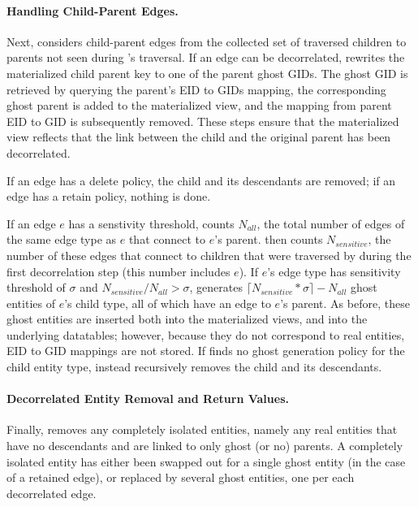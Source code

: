 \paragraph{Handling Child-Parent Edges.}
Next, \name considers child-parent edges from the collected set of traversed children to parents
not seen during \name's traversal. If an 
edge can be decorrelated, \name rewrites the materialized child parent key to one of the parent
ghost GIDs. The ghost GID is retrieved by querying the parent's EID to GIDs mapping, the
corresponding ghost parent is added to the materialized view,
and the mapping from parent EID to GID is subsequently removed. These steps ensure that the
materialized view reflects that the link between the child and the original parent has been
decorrelated.

If an edge has a delete policy, the child and its descendants are removed; if an edge has a retain
policy, nothing is done. 
%

If an edge $e$ has a senstivity threshold,
\name counts $N_{all}$, the total number of edges of the same edge type as $e$ that connect to $e$'s parent.
\name then counts $N_{sensitive}$, the number of these edges that connect to children that were traversed by \name during the
first decorrelation step (this number includes $e$).
If $e$'s edge type has sensitivity threshold of $\sigma$ and $N_{sensitive} / N_{all} > \sigma$,
\name generates $\lceil N_{sensitive}*\sigma\rceil - N_{all}$ ghost entities of $e$'s child type, all
of which have an edge to $e$'s parent.
As before, these ghost entities are inserted both into the materialized views, and into the underlying
datatables; however, because they do not correspond to real entities, EID to GID mappings are not
stored. 
If \name finds no ghost generation policy for the child entity type, \name instead recursively
removes the child and its descendants.

\paragraph{Decorrelated Entity Removal and Return Values.}
Finally, \name removes any completely isolated entities, namely any real entities that have no
descendants and are linked to only ghost (or no) parents. A completely isolated entity has either been swapped
out for a single ghost entity (in the case of a retained edge), or replaced by several ghost
entities, one per each decorrelated edge.


